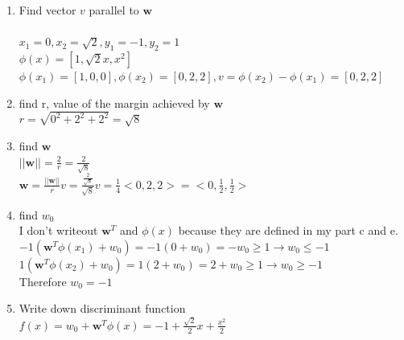 \documentclass[12pt]{article}
\begin{document}
\begin{enumerate}[noitemsep,topsep=1pt]
\begin{enumerate}
    \item Find vector $v$ parallel to $\mathbf{w}$ \\
    \\ $x_1=0, x_2=\sqrt{2}, y_1=-1, y_2=1$ 
    \\ $\phi(x)=[1,\sqrt{2}x,x^2]$ 
    \\ $\phi(x_1)=[1,0,0], \phi(x_2)=[0,2,2], v=\phi(x_2) - \phi(x_1) = [0,2,2]$
    \item find r, value of the margin achieved by $\mathbf{w}$
    \\ $r = \sqrt{0^2+2^2+2^2} = \sqrt{8} $
    \item find $\mathbf{w}$
    \\ $||\mathbf{w}|| = \frac{2}{r} = \frac{2}{\sqrt{8}}$ 
    \\ $\mathbf{w} = \frac{||\mathbf{w}||}{r}v = \frac{\frac{2}{\sqrt{8}}}{\sqrt{8}}v = 
    \frac{1}{4} <0,2,2> = <0, \frac{1}{2}, \frac{1}{2}> $
    \item find $w_0$
    \\ I don't writeout $\mathbf{w}^T$ and $\phi(x)$ because they are defined in my part c and e.
    \\ $-1(\mathbf{w}^T \phi(x_1) + w_0) = -1(0 + w_0) = -w_0 \geq 1 \rightarrow w_0 \leq -1$ 
    \\ $1(\mathbf{w}^T\phi(x_2) + w_0) = 1(2 + w_0) = 2 + w_0 \geq 1 \rightarrow w_0 \geq -1$
    \\ Therefore $w_0 = -1$
    \item Write down discriminant function 
    \\ $f(x) = w_0 + \mathbf{w}^T\phi(x)  = -1 + \frac{\sqrt{2}}{2}x + \frac{x^2}{2}$

\end{enumerate}
\end{enumerate}
\end{document}
